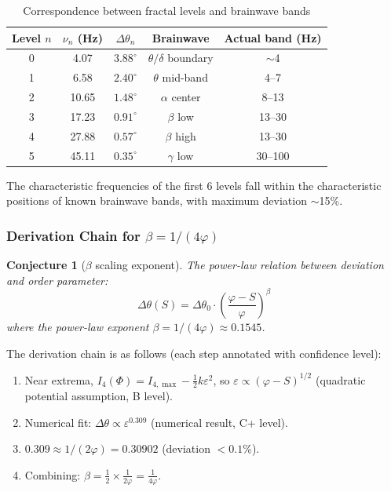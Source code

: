 \documentclass[12pt,a4paper,twocolumn]{article}
\renewcommand{\phi}{\varphi}
\newtheorem{conjecture}[theorem]{Conjecture}
\begin{document}
\begin{table}[htbp]
\centering
\caption{Correspondence between fractal levels and brainwave bands}
\label{tab:brain_waves_en}
\begin{tabular}{ccccc}
\hline
Level $n$ & $\nu_n$ (Hz) & $\Delta\theta_n$ & Brainwave & Actual band (Hz) \\
\hline
0 & 4.07 & $3.88^\circ$ & $\theta/\delta$ boundary & $\sim$4 \\
1 & 6.58 & $2.40^\circ$ & $\theta$ mid-band & 4--7 \\
2 & 10.65 & $1.48^\circ$ & $\alpha$ center & 8--13 \\
3 & 17.23 & $0.91^\circ$ & $\beta$ low & 13--30 \\
4 & 27.88 & $0.57^\circ$ & $\beta$ high & 13--30 \\
5 & 45.11 & $0.35^\circ$ & $\gamma$ low & 30--100 \\
\hline
\end{tabular}
\end{table}

The characteristic frequencies of the first 6 levels fall within the characteristic positions of known brainwave bands, with maximum deviation $\sim$15\%.

\subsubsection{Derivation Chain for $\beta = 1/(4\phi)$}

\begin{conjecture}[$\beta$ scaling exponent]
\label{conj:beta_en}
The power-law relation between deviation and order parameter:
\begin{equation}
\Delta\theta(S) = \Delta\theta_0 \cdot \left(\frac{\phi - S}{\phi}\right)^{\beta}
\label{eq:beta_scaling_en}
\end{equation}
where the power-law exponent $\beta = 1/(4\phi) \approx 0.1545$.
\end{conjecture}

The derivation chain is as follows (each step annotated with confidence level):
\begin{enumerate}
\item Near extrema, $I_4(\Phi) = I_{4,\max} - \frac{1}{2}k\varepsilon^2$, so $\varepsilon \propto (\phi - S)^{1/2}$ (quadratic potential assumption, B level).
\item Numerical fit: $\Delta\theta \propto \varepsilon^{0.309}$ (numerical result, C+ level).
\item $0.309 \approx 1/(2\phi) = 0.30902$ (deviation $<0.1\%$).
\item Combining: $\beta = \frac{1}{2} \times \frac{1}{2\phi} = \frac{1}{4\phi}$.
\end{enumerate}
\end{document}
